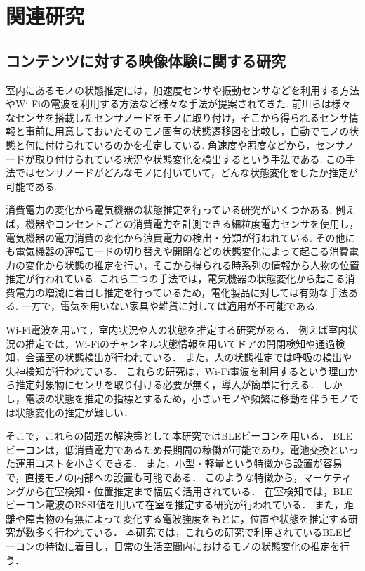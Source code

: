 \thispagestyle{myheadings}
\chapter{関連研究}

\section{コンテンツに対する映像体験に関する研究}
室内にあるモノの状態推定には，加速度センサや振動センサなどを利用する方法やWi-Fiの電波を利用する方法など様々な手法が提案されてきた.
前川ら\cite{TagAndThink}は様々なセンサを搭載したセンサノードをモノに取り付け，そこから得られるセンサ情報と事前に用意しておいたそのモノ固有の状態遷移図を比較し，自動でモノの状態と何に付けられているのかを推定している.
角速度や照度などから，センサノードが取り付けられている状況や状態変化を検出するという手法である.
この手法ではセンサノードがどんなモノに付いていて，どんな状態変化をしたか推定が可能である.

消費電力の変化から電気機器の状態推定を行っている研究がいくつかある.
例えば，機器やコンセントごとの消費電力を計測できる細粒度電力センサを使用し，電気機器の電力消費の変化から浪費電力の検出・分類が行われている\cite{sairyu}.
その他にも電気機器の運転モードの切り替えや開閉などの状態変化によって起こる消費電力の変化から状態の推定を行い，そこから得られる時系列の情報から人物の位置推定が行われている\cite{energy}.
これら二つの手法では，電気機器の状態変化から起こる消費電力の増減に着目し推定を行っているため，電化製品に対しては有効な手法ある.
一方で，電気を用いない家具や雑貨に対しては適用が不可能である.

Wi-Fi電波を用いて，室内状況や人の状態を推定する研究がある．
例えば室内状況の推定では，Wi-Fiのチャンネル状態情報を用いてドアの開閉検知\cite{WifiChannel}や通過検知\cite{LANgate}，会議室の状態検出\cite{Room-State}が行われている．
また，人の状態推定では呼吸の検出\cite{Human-Respiration}や失神検知\cite{WiFi-Toilet}が行われている．
これらの研究は，Wi-Fi電波を利用するという理由から推定対象物にセンサを取り付ける必要が無く，導入が簡単に行える．
しかし，電波の状態を推定の指標とするため，小さいモノや頻繁に移動を伴うモノでは状態変化の推定が難しい．

そこで，これらの問題の解決策として本研究ではBLEビーコンを用いる．
BLEビーコンは，低消費電力であるため長期間の稼働が可能であり，電池交換といった運用コストを小さくできる．
また，小型・軽量という特徴から設置が容易で，直接モノの内部への設置も可能である．
このような特徴から，マーケティング\cite{bleUse}から在室検知・位置推定まで幅広く活用されている．
在室検知では，BLEビーコン電波のRSSI値を用いて在室を推定する研究が行われている\cite{home-location, stay-estimation, en-AreaUsed, Finding_by_Counting, dakoku_system, makoto, konzatsu}．
また，距離や障害物の有無によって変化する電波強度をもとに，位置や状態を推定する研究が数多く行われている\cite{move-tracking, BLE-Localization, IoMT, tandem, blespot, en-door}．
本研究では，これらの研究で利用されているBLEビーコンの特徴に着目し，日常の生活空間内におけるモノの状態変化の推定を行う．


